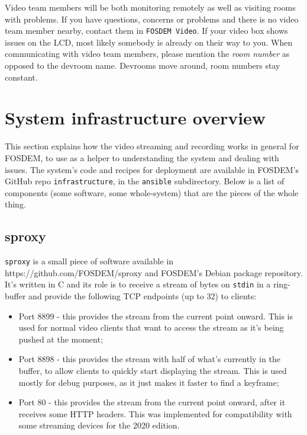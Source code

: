 \documentclass{article}
\begin{document}
Video team members will be both monitoring remotely as well as visiting rooms with problems. If you have questions, concerns or problems and there is no video team member nearby, contact them
in \texttt{FOSDEM Video}. If your video box shows issues on the LCD, most likely somebody is already on their way to you. When communicating with video team members, please mention the \emph{room number} as opposed to the devroom name. Devrooms move around, room numbers stay constant.

\section{System infrastructure overview}

This section explains how the video streaming and recording works in general for FOSDEM, to use as a helper to understanding the system and dealing with issues.
The system's code and recipes for deployment are available in FOSDEM's GitHub repo \texttt{infrastructure}, in the \texttt{ansible} subdirectory. Below is a list of components (some software, some whole-system) that are the pieces of the whole thing.

\subsection{sproxy}

\texttt{sproxy} is a small piece of software available in https://github.com/FOSDEM/sproxy and FOSDEM's Debian package repository. It's written in C and its role is to receive a stream of bytes on \texttt{stdin} in a ring-buffer and provide the following TCP endpoints (up to 32) to clients:

\begin{itemize}
  \item Port 8899 - this provides the stream from the current point onward. This is used for normal video clients that want to access the stream as it's being pushed at the moment;
  \item Port 8898 - this provides the stream with half of what's currently in the buffer, to allow clients to quickly start displaying the stream. This is used mostly for debug purposes, as it just makes it faster to find a keyframe;
  \item Port 80 - this provides the stream from the current point onward, after it receives some HTTP headers. This was implemented for compatibility with some streaming devices for the 2020 edition.
\end{itemize}
\end{document}
